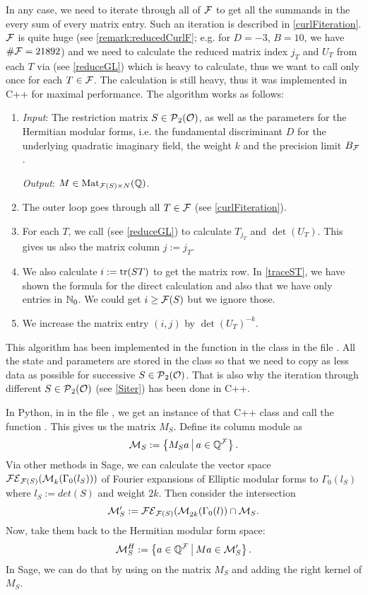 In any case, we need to iterate through all of $\mathcal{F}$ to get all the summands in the every sum of every matrix entry. Such an iteration is described in \cref{curlFiteration}. $\mathcal{F}$ is quite huge (see \cref{remark:reducedCurlF}; e.g. for $D=-3$, $B=10$, we have $\# \mathcal{F} = 21892$) and we need to calculate the reduced matrix index $j_T$ and $U_T$ from each $T$ via  (see \cref{reduceGL}) which is heavy to calculate, thus we want to call  only once for each $T \in \mathcal{F}$. The calculation is still heavy, thus it was implemented in C++ for maximal performance. The algorithm works as follows:
\begin{enumerate}
\item \emph{Input}: The restriction matrix $S \in \operatorname{\mathcal{P}}_2(\mathcal{O})$, as well as the parameters for the Hermitian modular forms, i.e. the fundamental discriminant $D$ for the underlying quadratic imaginary field, the weight $k$ and the precision limit $B_{\mathcal{F}}$.

\emph{Output}: $M \in \operatorname{Mat}_{\mathcal{F}(S) \times N}(\mathbb{Q})$.
\item The outer loop goes through all $T \in \mathcal{F}$ (see \cref{curlFiteration}).
\item For each $T$, we call  (see \cref{reduceGL}) to calculate $T_{j_T}$ and $\det(U_T)$. This gives us also the matrix column $j := j_T$.
\item We also calculate $i := \textup{\textrm{tr}}(ST)$ to get the matrix row. In \cref{traceST}, we have shown the formula for the direct calculation and also that we have only entries in $\mathbb{N}_0$. We could get $i \ge \mathcal{F}(S)$ but we ignore those.
\item We increase the matrix entry $(i,j)$ by $\det(U_T)^{-k}$.
\end{enumerate}
This algorithm has been implemented in the function  in the class  in the file . All the state and parameters are stored in the class so that we need to copy as less data as possible for successive $S \in \operatorname{\mathcal{P}}_2(\mathcal{O})$. That is also why the iteration through different $S \in \operatorname{\mathcal{P}}_2(\mathcal{O})$ (see \cref{Siter}) has been done in C++.

In Python, in  in the file , we get an instance of that C++ class and call the function . This gives us the matrix $M_S$. Define its column module as
\[ \mathcal{M}_S := \Set{M_S a}{a \in \Q^\F} . \]
Via other methods in Sage, we can calculate the vector space $ \mathcal{FE}_{\mathcal{F}(S)}(\operatorname{\mathcal{M}}^{}_{k} (\Gamma_0(l_S)))$ of Fourier expansions of Elliptic modular forms to $\Gamma_0(l_S)$ where $l_S := det(S)$ and weight $2k$. Then consider the intersection
\[ \mathcal{M}'_S := \mathcal{FE}_{\mathcal{F}(S)}(\operatorname{\mathcal{M}}^{}_{2k} (\Gamma_0(l)) \cap \mathcal{M}_S . \]
Now, take them back to the Hermitian modular form space:
\[ \mathcal{M}^H_S := \Set{a \in \Q^\F}{Ma \in \mathcal{M}'_S} . \]
In Sage, we can do that by using  on the matrix $M_S$ and adding the right kernel of $M_S$.

